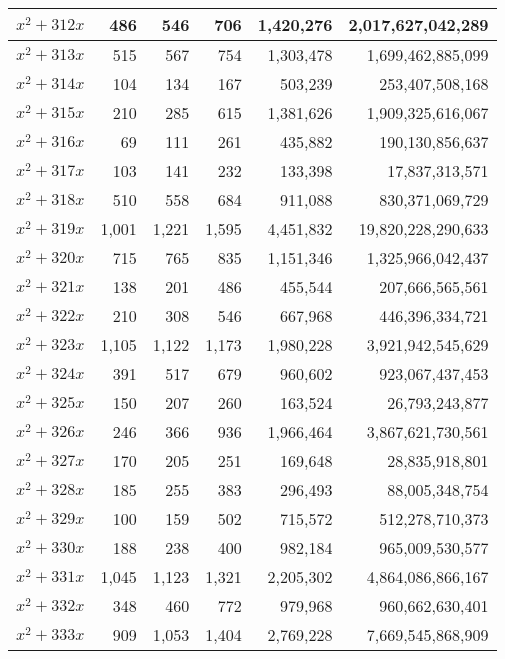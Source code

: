 \documentclass[a4paper]{amsproc}
\theoremstyle{plain}
\begin{document}
\begin{longtable}{ | l | r | r | r | r | r | }
$x^2 + 312x$ & 486 & 546 & 706 & 1{,}420{,}276 & 2{,}017{,}627{,}042{,}289 \\ \hline
$x^2 + 313x$ & 515 & 567 & 754 & 1{,}303{,}478 & 1{,}699{,}462{,}885{,}099 \\ \hline
$x^2 + 314x$ & 104 & 134 & 167 & 503{,}239 & 253{,}407{,}508{,}168 \\ \hline
$x^2 + 315x$ & 210 & 285 & 615 & 1{,}381{,}626 & 1{,}909{,}325{,}616{,}067 \\ \hline
$x^2 + 316x$ & 69 & 111 & 261 & 435{,}882 & 190{,}130{,}856{,}637 \\ \hline
$x^2 + 317x$ & 103 & 141 & 232 & 133{,}398 & 17{,}837{,}313{,}571 \\ \hline
$x^2 + 318x$ & 510 & 558 & 684 & 911{,}088 & 830{,}371{,}069{,}729 \\ \hline
$x^2 + 319x$ & 1{,}001 & 1{,}221 & 1{,}595 & 4{,}451{,}832 & 19{,}820{,}228{,}290{,}633 \\ \hline
$x^2 + 320x$ & 715 & 765 & 835 & 1{,}151{,}346 & 1{,}325{,}966{,}042{,}437 \\ \hline
$x^2 + 321x$ & 138 & 201 & 486 & 455{,}544 & 207{,}666{,}565{,}561 \\ \hline
$x^2 + 322x$ & 210 & 308 & 546 & 667{,}968 & 446{,}396{,}334{,}721 \\ \hline
$x^2 + 323x$ & 1{,}105 & 1{,}122 & 1{,}173 & 1{,}980{,}228 & 3{,}921{,}942{,}545{,}629 \\ \hline
$x^2 + 324x$ & 391 & 517 & 679 & 960{,}602 & 923{,}067{,}437{,}453 \\ \hline
$x^2 + 325x$ & 150 & 207 & 260 & 163{,}524 & 26{,}793{,}243{,}877 \\ \hline
$x^2 + 326x$ & 246 & 366 & 936 & 1{,}966{,}464 & 3{,}867{,}621{,}730{,}561 \\ \hline
$x^2 + 327x$ & 170 & 205 & 251 & 169{,}648 & 28{,}835{,}918{,}801 \\ \hline
$x^2 + 328x$ & 185 & 255 & 383 & 296{,}493 & 88{,}005{,}348{,}754 \\ \hline
$x^2 + 329x$ & 100 & 159 & 502 & 715{,}572 & 512{,}278{,}710{,}373 \\ \hline
$x^2 + 330x$ & 188 & 238 & 400 & 982{,}184 & 965{,}009{,}530{,}577 \\ \hline
$x^2 + 331x$ & 1{,}045 & 1{,}123 & 1{,}321 & 2{,}205{,}302 & 4{,}864{,}086{,}866{,}167 \\ \hline
$x^2 + 332x$ & 348 & 460 & 772 & 979{,}968 & 960{,}662{,}630{,}401 \\ \hline
$x^2 + 333x$ & 909 & 1{,}053 & 1{,}404 & 2{,}769{,}228 & 7{,}669{,}545{,}868{,}909 \\ \hline

\end{longtable}
\end{document}
